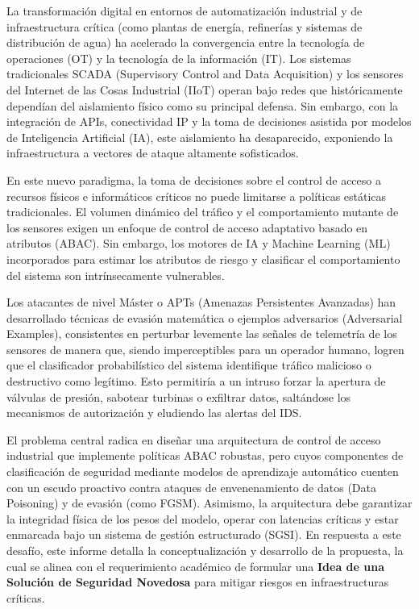 \documentclass[12pt,letterpaper]{article}
\begin{document}
La transformación digital en entornos de automatización industrial y de infraestructura crítica (como plantas de energía, refinerías y sistemas de distribución de agua) ha acelerado la convergencia entre la tecnología de operaciones (OT) y la tecnología de la información (IT). Los sistemas tradicionales SCADA (Supervisory Control and Data Acquisition) y los sensores del Internet de las Cosas Industrial (IIoT) operan bajo redes que históricamente dependían del aislamiento físico como su principal defensa. Sin embargo, con la integración de APIs, conectividad IP y la toma de decisiones asistida por modelos de Inteligencia Artificial (IA), este aislamiento ha desaparecido, exponiendo la infraestructura a vectores de ataque altamente sofisticados.

En este nuevo paradigma, la toma de decisiones sobre el control de acceso a recursos físicos e informáticos críticos no puede limitarse a políticas estáticas tradicionales. El volumen dinámico del tráfico y el comportamiento mutante de los sensores exigen un enfoque de control de acceso adaptativo basado en atributos (ABAC). Sin embargo, los motores de IA y Machine Learning (ML) incorporados para estimar los atributos de riesgo y clasificar el comportamiento del sistema son intrínsecamente vulnerables. 

Los atacantes de nivel Máster o APTs (Amenazas Persistentes Avanzadas) han desarrollado técnicas de evasión matemática o ejemplos adversarios (Adversarial Examples), consistentes en perturbar levemente las señales de telemetría de los sensores de manera que, siendo imperceptibles para un operador humano, logren que el clasificador probabilístico del sistema identifique tráfico malicioso o destructivo como legítimo. Esto permitiría a un intruso forzar la apertura de válvulas de presión, sabotear turbinas o exfiltrar datos, saltándose los mecanismos de autorización y eludiendo las alertas del IDS. 

El problema central radica en diseñar una arquitectura de control de acceso industrial que implemente políticas ABAC robustas, pero cuyos componentes de clasificación de seguridad mediante modelos de aprendizaje automático cuenten con un escudo proactivo contra ataques de envenenamiento de datos (Data Poisoning) y de evasión (como FGSM). Asimismo, la arquitectura debe garantizar la integridad física de los pesos del modelo, operar con latencias críticas y estar enmarcada bajo un sistema de gestión estructurado (SGSI). En respuesta a este desafío, este informe detalla la conceptualización y desarrollo de la propuesta, la cual se alinea con el requerimiento académico de formular una \textbf{Idea de una Solución de Seguridad Novedosa} para mitigar riesgos en infraestructuras críticas.
\end{document}
